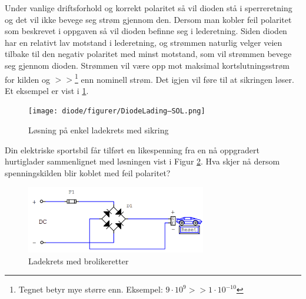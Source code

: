 \vspace{0.5cm} %

\begin{solution}[name=Løsningsforslag oppgave]
	
Under vanlige driftsforhold og korrekt polaritet så vil dioden stå i sperreretning og det vil ikke bevege seg strøm gjennom den. Dersom man kobler feil polaritet som beskrevet i oppgaven så vil dioden befinne seg i lederetning. Siden dioden har en relativt lav motstand i lederetning, og strømmen naturlig velger veien tilbake til den negativ polaritet med minst motstand, som vil strømmen bevege seg gjennom dioden. Strømmen vil være opp mot maksimal kortslutningsstrøm for kilden og $>>$\footnote{Tegnet betyr mye større enn. Eksempel: $9\cdot10^{9}>>1\cdot10^{-10}$} enn nominell strøm. Det igjen vil føre til at sikringen løser. Et eksempel er vist i \ref{fig:diodeLadingSol}.
	\begin{figure}[H]
	\centering
	\texttt{[image: diode/figurer/DiodeLading–SOL.png]}
	\caption{Løsning på enkel ladekrets med sikring}
	\label{fig:diodeLadingSol}
\end{figure}

	
\end{solution}




\begin{question}[name=Oppgave, topic=dioder]
	Din elektriske sportsbil får tilført en likespenning fra en nå oppgradert hurtiglader sammenlignet med løsningen vist i Figur \ref{fig:diodeLadingG}. Hva skjer nå dersom spenningskilden blir koblet med feil polaritet?
	
	\begin{figure}[H]
		\centering
		\includegraphics[width=0.7\textwidth]{diode/figurer/GretzLading.png}
		\caption{Ladekrets med brolikeretter}
		\label{fig:diodeLadingG}
	\end{figure}
	
\end{question}

\vspace{0.5cm} %

